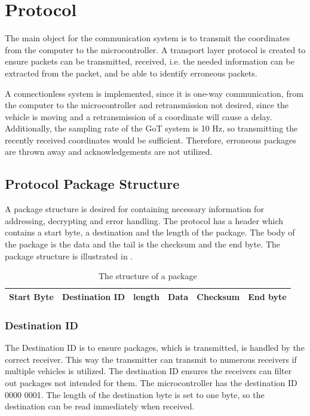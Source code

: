 \section{Protocol}\label{sec:Protocol}
The main object for the communication system is to transmit the coordinates from the computer to the microcontroller. A transport layer protocol is created to ensure packets can be transmitted, received, i.e. the needed information can be extracted from the packet, and be able to identify erroneous packets.

A connectionless system is implemented, since it is one-way communication, from the computer to the microcontroller and retransmission not desired, since the vehicle is moving and a retransmission of a coordinate will cause a delay. Additionally, the sampling rate of the GoT system is 10 \si{Hz}, so transmitting the recently received coordinates would be sufficient. Therefore, erroneous packages are thrown away and acknowledgements are not utilized.

\subsection{Protocol Package Structure}
A package structure is desired for containing necessary information for addressing, decrypting and error handling. The protocol has a header which contains a start byte, a destination and the length of the package. The body of the package is the data and the tail is the checksum and the end byte. The package structure is illustrated in .

\begin{table}[H]\centering
\begin{tabular}{|>{\centering\arraybackslash}m{2cm}|>{\centering\arraybackslash}m{3cm}|>{\centering\arraybackslash}m{2cm}|>{\centering\arraybackslash}m{2cm}|>{\centering\arraybackslash}m{2cm}|>{\centering\arraybackslash}m{2cm}|}
\hline
Start Byte & Destination ID & length & Data & Checksum & End byte \\
\hline
\end{tabular}
\caption{The structure of a package}
\label{CoorSetup}
\end{table}

\subsubsection{Destination ID}
The Destination ID is to ensure packages, which is transmitted, is handled by the correct receiver. This way the transmitter can transmit to numerous receivers if multiple vehicles is utilized. The destination ID ensures the receivers can filter out packages not intended for them. The microcontroller has the destination ID 0000 0001. The length of the destination byte is set to one byte, so the destination can be read immediately when received.

